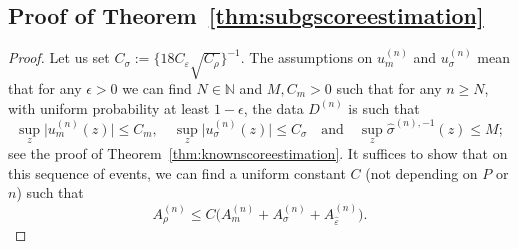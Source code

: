 \documentclass[aos]{imsart}
\begin{document}
	
	
	\subsection{Proof of Theorem~\ref{thm:subgscoreestimation}}
	
	\begin{proof}
		Let us set $C_{\sigma} := \{18 C_{\varepsilon} \sqrt{C_{\rho}}\}^{-1}$.
		The assumptions on $u_m^{(n)}$ and $u_\sigma^{(n)}$ mean that for any $\epsilon > 0$ we can find $N \in  \mathbb{N}$ and $M, C_m >0 $ such that for any $n\geq N$, with uniform probability at least $1-\epsilon$, the data $D^{(n)}$ is such that
		\begin{equation}
			\label{eqn:locscaleoundederrors}
			\sup_{z}\big|u_m^{(n)}(z)\big| \leq C_m, \quad \sup_{z}\big|u_\sigma^{(n)}(z)\big| \leq C_\sigma \quad \text{and} \quad \sup_z \hat{\sigma}^{(n),-1}(z) \leq M;
		\end{equation} 
		see the proof of Theorem~\ref{thm:knownscoreestimation}.
		It suffices to show that on this sequence  of events, we can find a uniform constant $C$ (not depending on $P$ or $n$) such that \begin{equation*}
			A_\rho^{(n)} \leq C\big(A_m^{(n)} + A_\sigma^{(n)} + A_{\hat\varepsilon}^{(n)}\big).
		\end{equation*}
		

\end{proof}
\end{document}
